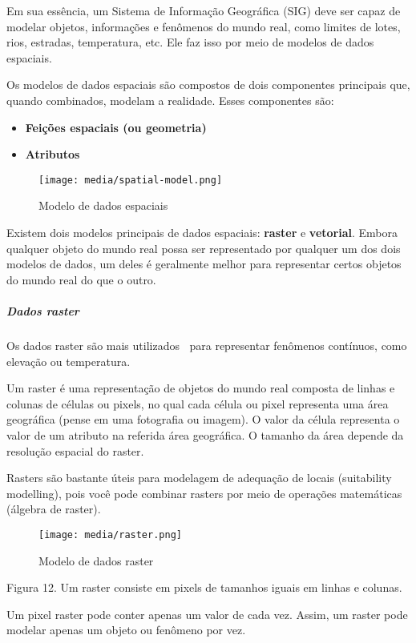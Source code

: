 \documentclass[
]{book}
\providecommand{\tightlist}{%
  \setlength{\itemsep}{0pt}\setlength{\parskip}{0pt}}
\theoremstyle{definition}
\theoremstyle{definition}
\theoremstyle{definition}
\theoremstyle{definition}
\theoremstyle{remark}
\begin{document}
Em sua essência, um Sistema de Informação Geográfica (SIG) deve ser capaz de modelar objetos, informações e fenômenos do mundo real, como limites de lotes, rios, estradas, temperatura, etc. Ele faz isso por meio de modelos de dados espaciais.

Os modelos de dados espaciais são compostos de dois componentes principais que, quando combinados, modelam a realidade. Esses componentes são:

\begin{itemize}
\tightlist
\item
  \textbf{Feições espaciais (ou geometria)}
\item
  \textbf{Atributos}
\end{itemize}

\begin{figure}
\centering
\texttt{[image: media/spatial-model.png]}
\caption{Modelo de dados espaciais}
\end{figure}

Existem dois modelos principais de dados espaciais: \textbf{raster} e \textbf{vetorial}. Embora qualquer objeto do mundo real possa ser representado por qualquer um dos dois modelos de dados, um deles é geralmente melhor para representar certos objetos do mundo real do que o outro.

\hypertarget{dados-raster}{%
\subparagraph{Dados raster}\label{dados-raster}}

Os dados raster são mais utilizados para representar fenômenos contínuos, como elevação ou temperatura.

Um raster é uma representação de objetos do mundo real composta de linhas e colunas de células ou pixels, no qual cada célula ou pixel representa uma área geográfica (pense em uma fotografia ou imagem). O valor da célula representa o valor de um atributo na referida área geográfica. O tamanho da área depende da resolução espacial do raster.

Rasters são bastante úteis para modelagem de adequação de locais (suitability modelling), pois você pode combinar rasters por meio de operações matemáticas (álgebra de raster).

\begin{figure}
\centering
\texttt{[image: media/raster.png]}
\caption{Modelo de dados raster}
\end{figure}

Figura 12. Um raster consiste em pixels de tamanhos iguais em linhas e colunas.

Um pixel raster pode conter apenas um valor de cada vez. Assim, um raster pode modelar apenas um objeto ou fenômeno por vez.
\end{document}
